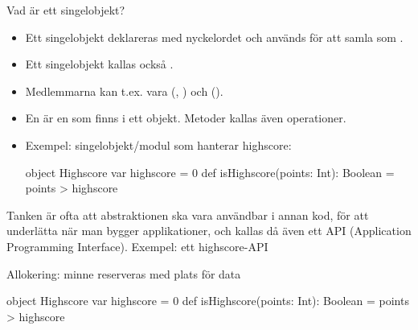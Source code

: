 
\begin{Slide}{Vad är ett singelobjekt?}
\begin{itemize}\SlideFontSmall
\item Ett singelobjekt  deklareras med nyckelordet  och används för att samla   som .
\item Ett singelobjekt kallas också  .
\item Medlemmarna kan t.ex. vara  (, ) och  (). 
\item En  är en  som finns i ett objekt. Metoder kallas även operationer.
\item Exempel: singelobjekt/modul som hanterar highscore:
\begin{Code}
object Highscore {
  var highscore = 0
  def isHighscore(points: Int): Boolean = points > highscore
}
\end{Code}
\end{itemize}
\pause
{\SlideFontTiny Tanken är ofta att abstraktionen ska vara användbar i annan kod, för att underlätta när man bygger applikationer, och kallas då även ett API (Application Programming Interface). Exempel: ett highscore-API}
\end{Slide}


\begin{Slide}{Allokering: minne reserveras med plats för data}
\begin{Code}
object Highscore {
  var highscore = 0
  def isHighscore(points: Int): Boolean = points > highscore
}
\end{Code}
\pause
{}
\end{Slide}


